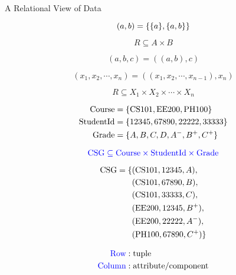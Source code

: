 \begin{frame}{}

  \vspace{0.50cm}
  \centerline{\Large A Relational View of Data}
\end{frame}

\begin{frame}{}
  \[
    (a,b) = \{\{a\}, \{a,b\}\}
  \]
  
  \[
    R \subseteq A \times B
  \]

  \pause
  \[
    (a, b, c) = ((a,b), c)
  \]

  \pause
  \[
    (x_1, x_2, \cdots, x_n) = ((x_1, x_2, \cdots, x_{n-1}), x_n)
  \]

  \pause
  \[
    R \subseteq X_1 \times X_2 \times \cdots \times X_n
  \]
\end{frame}

\begin{frame}{}
  \begin{align*}
    \text{Course} &= \{\text{CS}101{}, \text{EE}200{}, \text{PH}100{}\} \\
    \text{StudentId} &= \{12345, 67890, 22222, 33333\}  \\
    \text{Grade} &= \{A, B, C, D, A^{-}, B^{+}, C^{+}\}
  \end{align*}

  \pause
  \[
    \textcolor{blue}{\text{CSG} \subseteq \text{Course}{} \times \text{StudentId}{} \times \text{Grade}{}}
  \]

  \pause
  \vspace{-0.30cm}
  \begin{align*}
    \text{CSG} = \{ &(\text{CS}101{}, 12345, A), \\
      & (\text{CS}101{}, 67890, B), \\
      & (\text{CS}101{}, 33333, C), \\
      & (\text{EE}200{}, 12345, B^{+}), \\
      & (\text{EE}200{}, 22222, A^{-}), \\
      & (\text{PH}100{}, 67890, C^{+}) \}
  \end{align*}
\end{frame}

\begin{frame}{}

  \pause
  \begin{align*}
    \text{\textcolor{blue}{Row}} &: \text{tuple} \\
    \text{\textcolor{blue}{Column}} &: \text{attribute/component}
  \end{align*}
\end{frame}

